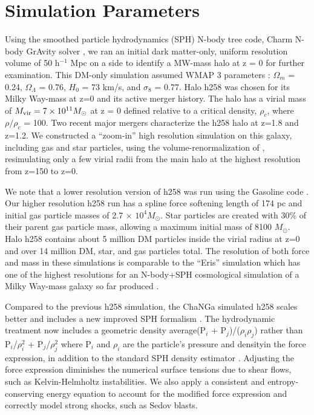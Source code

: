 \documentclass[]{emulateapj}
\begin{document}



\section{Simulation Parameters}\label{sec-model}

Using the smoothed particle hydrodynamics (SPH) N-body tree code, Charm N-body GrAvity solver \citep[ChaNGa;][]{Menon2015}, we ran an initial dark matter-only, uniform resolution volume of 50 h$^{-1}$ Mpc on a side to identify a MW-mass halo at z = 0 for further examination. This DM-only simulation assumed WMAP 3 parameters \citep{Spergel2007}: $\Omega_m$ = 0.24, $\Omega_{\Lambda}$ = 0.76, $H_0$ = 73 km/s, and $\sigma _8$ = 0.77. Halo h258 was chosen for its Milky Way-mass at z=0 and its active merger history. The halo has a virial mass of $M_{\rm vir} = 7 \times 10^{11} M_{\odot}$ at z = 0 defined relative to a critical density, $\rho_c$, where $\rho / \rho_c$ = 100. Two recent major mergers characterize the h258 halo at z=1.8 and z=1.2. We constructed a ``zoom-in'' high resolution simulation on this galaxy, including gas and star particles, using the volume-renormalization of \cite{Katz1993}, resimulating only a few virial radii from the main halo at the highest resolution from z=150 to z=0.  

We note that a lower resolution version of h258 was run using the Gasoline code \citep{Wadsley2004}. Our higher resolution h258 run has a spline force softening length of 174 pc and initial gas particle masses of 2.7 $\times$ $10^4 M_{\odot}$. Star particles are created with 30$\%$ of their parent gas particle mass, allowing a maximum initial mass of 8100 $M_{\odot}$. Halo h258 contains about 5 million DM particles inside the virial radius at z=0 and over 14 million DM, star, and gas particles total. The resolution of both force and mass in these simulations is comparable to the ``Eris'' simulation which has one of the highest resolutions for an N-body+SPH cosmological simulation of a Milky Way-mass galaxy so far produced \citep{Guedes2011}.  

Compared to the previous h258 simulation, the ChaNGa simulated h258 scales better and includes a new improved SPH formalism \citep{Keller2014}. The hydrodynamic treatment now includes a geometric density average\textemdash (P$_i$ + P$_j$)/($\rho_i \rho_j$) rather than P$_i$/$\rho_{i}^2$ + P$_j$/$\rho_{j}^2$ where P$_i$ and $\rho_i$ are the particle's pressure and density\textemdash in the force expression, in addition to the standard SPH density estimator \citep{Ritchie2001}. Adjusting the force expression diminishes the numerical surface tensions due to shear flows, such as Kelvin-Helmholtz instabilities. We also apply a consistent and entropy-conserving energy equation to account for the modified force expression and correctly model strong shocks, such as Sedov blasts.
\end{document}
